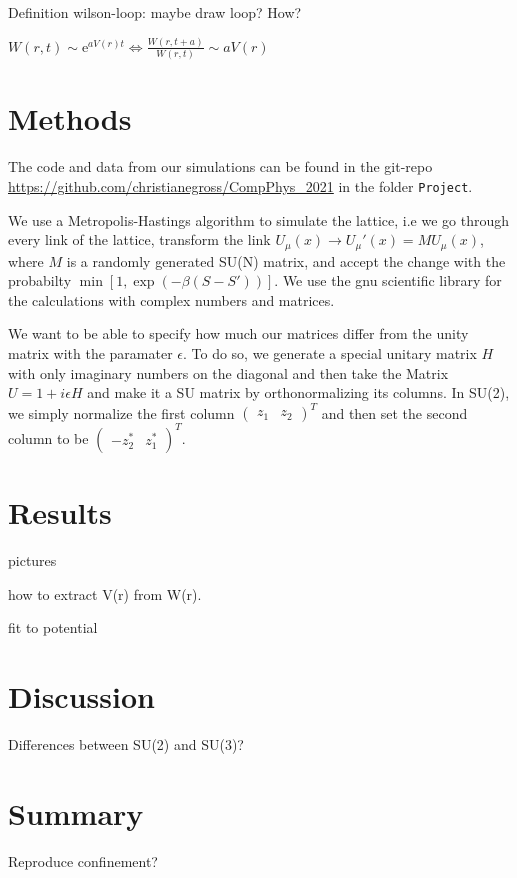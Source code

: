 \documentclass[%
 reprint,
 amsmath,amssymb,
 aps,
]{revtex4-1}
\begin{document}
Definition wilson-loop: maybe draw loop? How?

$W(r,t)\sim \mathrm{e}^{aV(r)t}\Leftrightarrow \frac{W(r,t+a)}{W(r,t)}\sim aV(r)$

\section{Methods}


The code and data from our simulations can be found in the git-repo \url{https://github.com/christianegross/CompPhys_2021} in the folder \texttt{Project}.

We use a Metropolis-Hastings algorithm to simulate the lattice, i.e we go through every link of the lattice, transform the link $U_\mu(x)\to U_\mu'(x)=MU_\mu(x)$, where $M$ is a randomly generated SU(N) matrix, and accept the change with the probabilty $\min[1, \exp(-\beta(S-S'))]$. We use the gnu scientific library for the calculations with complex numbers and matrices.

We want to be able to specify how much our matrices differ from the unity matrix with the paramater $\epsilon$. To do so, we generate a special unitary matrix $H$ with only imaginary numbers on the diagonal and then take the Matrix $U=1+i\epsilon H$ and make it a SU matrix by orthonormalizing its columns. In SU(2), we simply normalize the first column $\begin{pmatrix}z_1&z_2\end{pmatrix}^T$ and then set the second column to be $\begin{pmatrix}
-z_2^*&z_1^*\end{pmatrix}^T$.

\section{Results}

pictures

how to extract V(r) from W(r).

fit to potential

\section{Discussion}

Differences between SU(2) and SU(3)?

\section{Summary}

Reproduce confinement?


\end{document}
